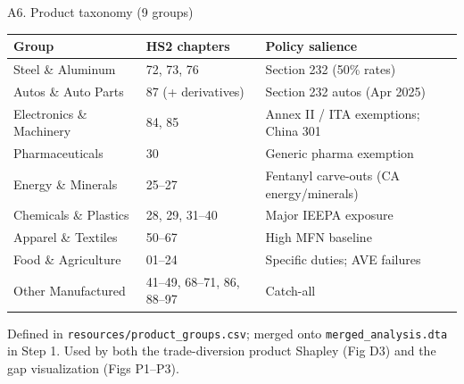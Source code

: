 \documentclass[aspectratio=169,10pt]{beamer}
\begin{document}
\begin{frame}{A6. Product taxonomy (9 groups)}
\hypertarget{appendix_products}{}

\small

\begin{tabular}{l l l}
\toprule
Group & HS2 chapters & Policy salience \\
\midrule
Steel \& Aluminum         & 72, 73, 76          & Section 232 (50\% rates) \\
Autos \& Auto Parts       & 87 (+ derivatives)  & Section 232 autos (Apr 2025) \\
Electronics \& Machinery  & 84, 85              & Annex II / ITA exemptions; China 301 \\
Pharmaceuticals           & 30                  & Generic pharma exemption \\
Energy \& Minerals        & 25--27              & Fentanyl carve-outs (CA energy/minerals) \\
Chemicals \& Plastics     & 28, 29, 31--40      & Major IEEPA exposure \\
Apparel \& Textiles       & 50--67              & High MFN baseline \\
Food \& Agriculture       & 01--24              & Specific duties; AVE failures \\
Other Manufactured        & 41--49, 68--71, 86, 88--97 & Catch-all \\
\bottomrule
\end{tabular}

\vspace{0.6em}

Defined in \texttt{resources/product\_groups.csv}; merged onto \texttt{merged\_analysis.dta} in Step 1. Used by both the trade-diversion product Shapley (Fig D3) and the gap visualization (Figs P1--P3).

\vfill
\hyperlink{slide_diversion_product}{}

\end{frame}
\end{document}
